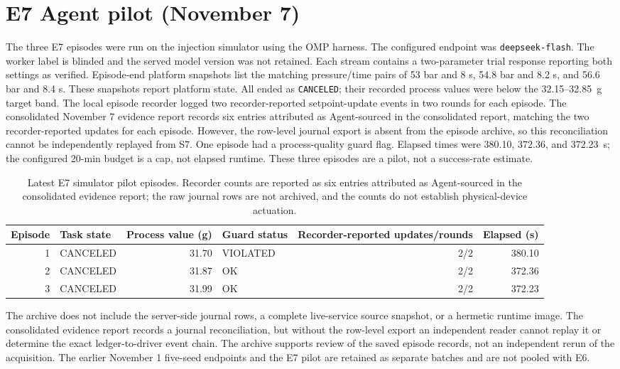 \documentclass[10pt]{article}
\begin{document}
\section*{E7 Agent pilot (November 7)}
The three E7 episodes were run on the injection simulator using the OMP harness. The configured endpoint was \texttt{deepseek-flash}. The worker label is blinded and the served model version was not retained. Each stream contains a two-parameter trial response reporting both settings as verified. Episode-end platform snapshots list the matching pressure/time pairs of 53 bar and 8 s, 54.8 bar and 8.2 s, and 56.6 bar and 8.4 s. These snapshots report platform state. All ended as \texttt{CANCELED}; their recorded process values were below the 32.15--32.85~g target band. The local episode recorder logged two recorder-reported setpoint-update events in two rounds for each episode. The consolidated November 7 evidence report records six entries attributed as Agent-sourced in the consolidated report, matching the two recorder-reported updates for each episode. However, the row-level journal export is absent from the episode archive, so this reconciliation cannot be independently replayed from S7. One episode had a process-quality guard flag. Elapsed times were 380.10, 372.36, and 372.23~s; the configured 20-min budget is a cap, not elapsed runtime. These three episodes are a pilot, not a success-rate estimate.

\begin{table}[htbp]
\centering
\caption{Latest E7 simulator pilot episodes. Recorder counts are reported as six entries attributed as Agent-sourced in the consolidated evidence report; the raw journal rows are not archived, and the counts do not establish physical-device actuation.}
\label{tab:s7-e7}
\footnotesize
\begin{tabular}{@{}r l r l r r@{}}
\toprule
Episode & Task state & Process value (g) & Guard status & Recorder-reported updates/rounds & Elapsed (s) \\
\midrule
1 & CANCELED & 31.70 & VIOLATED & 2/2 & 380.10 \\
2 & CANCELED & 31.87 & OK & 2/2 & 372.36 \\
3 & CANCELED & 31.99 & OK & 2/2 & 372.23 \\
\bottomrule
\end{tabular}
\end{table}

The archive does not include the server-side journal rows, a complete live-service source snapshot, or a hermetic runtime image. The consolidated evidence report records a journal reconciliation, but without the row-level export an independent reader cannot replay it or determine the exact ledger-to-driver event chain. The archive supports review of the saved episode records, not an independent rerun of the acquisition. The earlier November 1 five-seed endpoints and the E7 pilot are retained as separate batches and are not pooled with E6.
\end{document}
